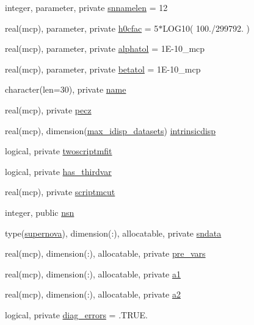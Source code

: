 \begin{DoxyCompactItemize}
\item 
integer, parameter, private \mbox{\hyperlink{namespacesnls_a0985d8ccb89aafea09ab6de4c78c5600}{snnamelen}} = 12
\item 
real(mcp), parameter, private \mbox{\hyperlink{namespacesnls_ae1879f7b41dc92841a8396c15ed20751}{h0cfac}} = 5$\ast$L\+O\+G10( 100./299792. )
\item 
real(mcp), parameter, private \mbox{\hyperlink{namespacesnls_a0788c80251a81d3072f95cb12143388d}{alphatol}} = 1\+E-\/10\+\_\+mcp
\item 
real(mcp), parameter, private \mbox{\hyperlink{namespacesnls_a2e0b3cead11bfcbc6a35da642d41c977}{betatol}} = 1\+E-\/10\+\_\+mcp
\item 
character(len=30), private \mbox{\hyperlink{namespacesnls_a33bba3eb52cb06fe4ca4b1beb737c7f4}{name}}
\item 
real(mcp), private \mbox{\hyperlink{namespacesnls_a01a9c6e8b04129b6a2c1b9bbd4cd6cc9}{pecz}}
\item 
real(mcp), dimension(\mbox{\hyperlink{namespacesnls_a82d4a9b322c284cf9bba27e6c86cb4f9}{max\+\_\+idisp\+\_\+datasets}}) \mbox{\hyperlink{namespacesnls_aea5409adea753b625ccfc1d60e5705d5}{intrinsicdisp}}
\item 
logical, private \mbox{\hyperlink{namespacesnls_aa5648511eb2e907f92a3a833acaafd98}{twoscriptmfit}}
\item 
logical, private \mbox{\hyperlink{namespacesnls_a62af67a93e31f94478aa58343fe5c04d}{has\+\_\+thirdvar}}
\item 
real(mcp), private \mbox{\hyperlink{namespacesnls_ac747536aeed92aaeab54e9366afeefd2}{scriptmcut}}
\item 
integer, public \mbox{\hyperlink{namespacesnls_abc05ea854fb8f639d617703ff33dcf41}{nsn}}
\item 
type(\mbox{\hyperlink{structsnls_1_1supernova}{supernova}}), dimension(\+:), allocatable, private \mbox{\hyperlink{namespacesnls_ad60f7a857849e3df34947a9a90a53f38}{sndata}}
\item 
real(mcp), dimension(\+:), allocatable, private \mbox{\hyperlink{namespacesnls_a3a2029fb54b5f14f48f328a2b9cf9d98}{pre\+\_\+vars}}
\item 
real(mcp), dimension(\+:), allocatable, private \mbox{\hyperlink{namespacesnls_a7a5b5ef85de03b3345f24e542dccf2fe}{a1}}
\item 
real(mcp), dimension(\+:), allocatable, private \mbox{\hyperlink{namespacesnls_a6472548375e64b614a5e7cae1b635b59}{a2}}
\item 
logical, private \mbox{\hyperlink{namespacesnls_ae0c3dc7f2e96ed1de4ff8dfcc81195e9}{diag\+\_\+errors}} = .T\+R\+U\+E.

\end{DoxyCompactItemize}
